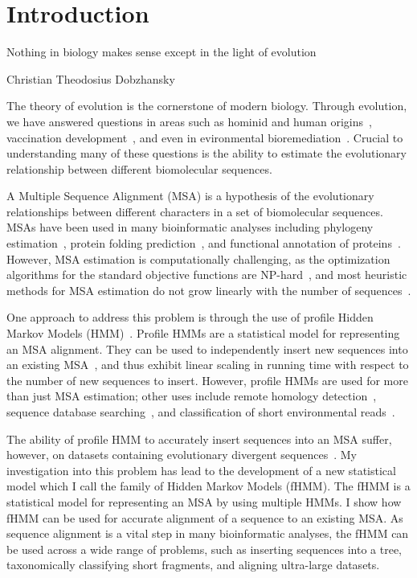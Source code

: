 \chapter{Introduction}\label{intro}
%
\epigraph{Nothing in biology makes sense except in the light of evolution}{Christian Theodosius Dobzhansky}

The theory of evolution is the cornerstone of modern biology.  Through evolution, we have answered questions in areas such as hominid and human origins~\cite{Martin1990,Takahata1997}, vaccination development~\cite{Wilder-Smith2010,Fitch1993}, and even in evironmental bioremediation~\cite{Liu1993}.  Crucial to understanding many of these questions is the ability to estimate the evolutionary relationship between different biomolecular sequences.

A Multiple Sequence Alignment (MSA) is a hypothesis of the evolutionary relationships between different characters in a set of biomolecular sequences.  MSAs have been used in many bioinformatic analyses including phylogeny estimation~\cite{Holder2003}, protein folding prediction~\cite{Karplus2009}, and functional annotation of proteins~\cite{Finn2010}.  However, MSA estimation is computationally challenging, as the optimization algorithms for the standard objective functions are NP-hard~\cite{Wang1994,Bonizzoni2001}, and most heuristic methods for MSA estimation do not grow linearly with the number of sequences~\cite{Notredame2002}.

One approach to address this problem is through the use of profile Hidden Markov Models (HMM)~\cite{Eddy1998}.  Profile HMMs are a statistical model for representing an MSA alignment.  They can be used to independently insert new sequences into an existing MSA~\cite{Eddy1998}, and thus exhibit linear scaling in running time with respect to the number of new sequences to insert.  However, profile HMMs are used for more than just MSA estimation; other uses include remote homology detection~\cite{Finn2010}, sequence database searching~\cite{Punta2012}, and classification of short environmental reads~\cite{Gerlach2011}.  

The ability of profile HMM to accurately insert sequences into an MSA suffer, however, on datasets containing evolutionary divergent sequences~\cite{Moriyama2006,Finn2010}.  My investigation into this problem has lead to the development of a new statistical model which I call the family of Hidden Markov Models (fHMM).  The fHMM is a statistical model for representing an MSA by using multiple HMMs.  I show how fHMM can be used for accurate alignment of a sequence to an existing MSA.  As sequence alignment is a vital step in many bioinformatic analyses, the fHMM can be used across a wide range of problems, such as inserting sequences into a tree, taxonomically classifying short fragments, and aligning ultra-large datasets.

